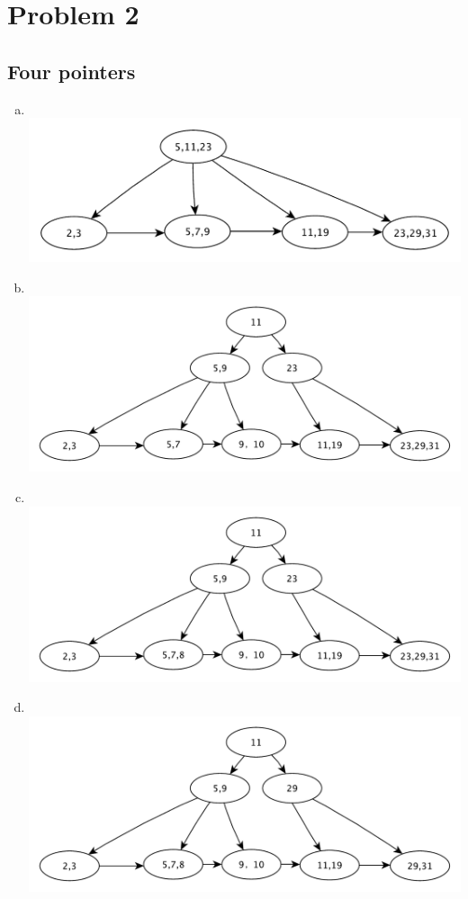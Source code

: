 \documentclass[a4paper,11pt]{article}
\begin{document}
\section*{Problem 2}
\subsection*{Four pointers}
\begin{enumerate}[a.]
    \item ~\\
        \includegraphics[scale=0.7]{2-1-1}
    \item ~\\
        \includegraphics[scale=0.7]{2-1-2}
    \item ~\\
        \includegraphics[scale=0.7]{2-1-3}
    \item ~\\
        \includegraphics[scale=0.7]{2-1-4}

\end{enumerate}
\end{document}
